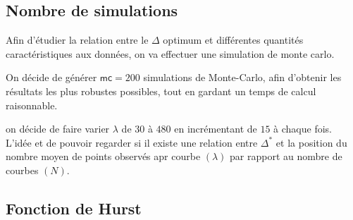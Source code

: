 \subsection{Nombre de simulations}

Afin d'étudier la relation entre le $\Delta$ optimum et différentes quantités caractéristiques aux données, on va effectuer une simulation de monte carlo.

On décide de générer $\mathsf{mc} = 200$ simulations de Monte-Carlo, afin d'obtenir les résultats les plus robustes possibles, tout en gardant un temps de calcul raisonnable.


on décide de faire varier $\lambda$ de $30$ à $480$ en incrémentant de $15$ à chaque fois. L'idée et de pouvoir regarder si il existe une relation entre $\Delta^*$ et la position du nombre moyen de points observés apr courbe $(\lambda)$ par rapport au nombre de courbes $(N)$.


\newcommand{\tlnm}{T^{[\lambda]}_{n}[m]}
\newcommand{\mset}{\llbracket 1, M_n \rrbracket}
\newcommand{\nset}{\llbracket 1, N \rrbracket}
\newcommand{\lbdset}{\llbracket 30, 45, \dots , 480 \rrbracket}
\newcommand{\genxset}{\bigl(\tlnm, X_n(\tlnm)\bigr)_{m \in \mset}}
\newcommand{\simset}{\left\{ \genxset \, : \, n \in \nset, \, \lambda \& N \textsf{ fixés } \right\}}
\newcommand{\simsetall}{\left\{ \genxset \, : \, N \in \overrightarrow N, \, \lambda \in \lbdset, \, n \in \nset \right\}}

\subsection{Fonction de Hurst}

